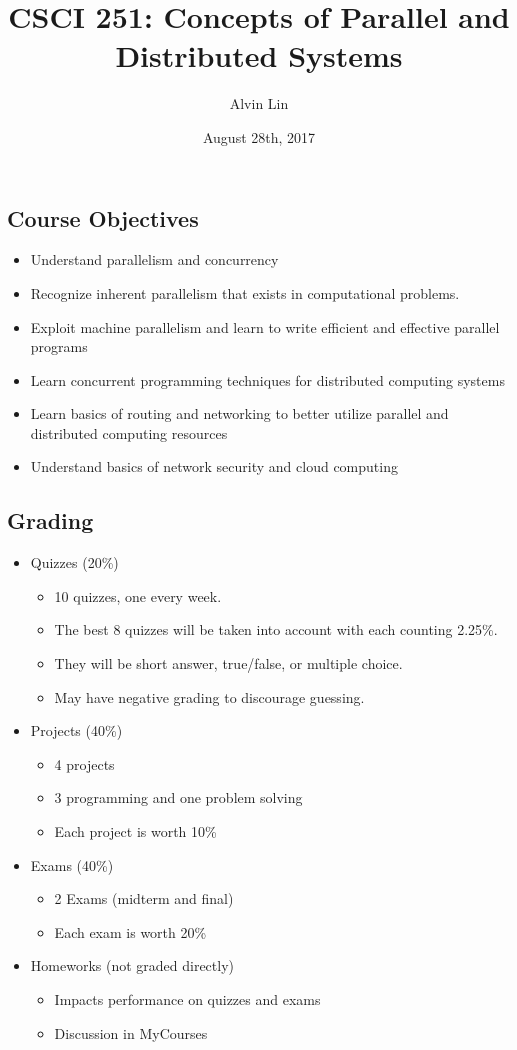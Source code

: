 \documentclass[letterpaper, 12pt]{article}
\title{CSCI 251: Concepts of Parallel and Distributed Systems}
\author{Alvin Lin}
\date{August 28th, 2017}
\begin{document}
\maketitle

\subsection*{Course Objectives}
\begin{itemize}
  \item Understand parallelism and concurrency
  \item Recognize inherent parallelism that exists in computational problems.
  \item Exploit machine parallelism and learn to write efficient and effective
    parallel programs
  \item Learn concurrent programming techniques for distributed computing
    systems
  \item Learn basics of routing and networking to better utilize parallel and
    distributed computing resources
  \item Understand basics of network security and cloud computing
\end{itemize}

\subsection*{Grading}
\begin{itemize}
  \item Quizzes (20\%)
  \begin{itemize}
    \item 10 quizzes, one every week.
    \item The best 8 quizzes will be taken into account with each counting
      2.25\%.
    \item They will be short answer, true/false, or multiple choice.
    \item May have negative grading to discourage guessing.
  \end{itemize}
  \item Projects (40\%)
  \begin{itemize}
    \item 4 projects
    \item 3 programming and one problem solving
    \item Each project is worth 10\%
  \end{itemize}
  \item Exams (40\%)
  \begin{itemize}
    \item 2 Exams (midterm and final)
    \item Each exam is worth 20\%
  \end{itemize}
  \item Homeworks (not graded directly)
  \begin{itemize}
    \item Impacts performance on quizzes and exams
    \item Discussion in MyCourses
  \end{itemize}
\end{itemize}
\end{document}
